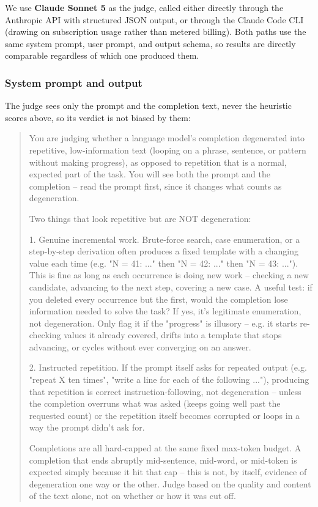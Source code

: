 \documentclass{article}
\begin{document}
We use \textbf{Claude Sonnet 5} as the judge, called either directly through
the Anthropic API with structured JSON output, or through the Claude Code
CLI (drawing on subscription usage rather than metered billing). Both paths
use the same system prompt, user prompt, and output schema, so results are
directly comparable regardless of which one produced them.

\subsubsection{System prompt and output}

The judge sees only the prompt and the completion text, never the
heuristic scores above, so its verdict is not biased by them:

\begin{quote}
\small\ttfamily\raggedright
You are judging whether a language model's completion degenerated into repetitive, low-information text (looping on a phrase, sentence, or pattern without making progress), as opposed to repetition that is a normal, expected part of the task. You will see both the prompt and the completion -- read the prompt first, since it changes what counts as degeneration.

Two things that look repetitive but are NOT degeneration:

1. Genuine incremental work. Brute-force search, case enumeration, or a step-by-step derivation often produces a fixed template with a changing value each time (e.g. "N = 41: ..." then "N = 42: ..." then "N = 43: ..."). This is fine as long as each occurrence is doing new work -- checking a new candidate, advancing to the next step, covering a new case. A useful test: if you deleted every occurrence but the first, would the completion lose information needed to solve the task? If yes, it's legitimate enumeration, not degeneration. Only flag it if the "progress" is illusory -- e.g. it starts re-checking values it already covered, drifts into a template that stops advancing, or cycles without ever converging on an answer.

2. Instructed repetition. If the prompt itself asks for repeated output (e.g. "repeat X ten times", "write a line for each of the following ..."), producing that repetition is correct instruction-following, not degeneration -- unless the completion overruns what was asked (keeps going well past the requested count) or the repetition itself becomes corrupted or loops in a way the prompt didn't ask for.

Completions are all hard-capped at the same fixed max-token budget. A completion that ends abruptly mid-sentence, mid-word, or mid-token is expected simply because it hit that cap -- this is not, by itself, evidence of degeneration one way or the other. Judge based on the quality and content of the text alone, not on whether or how it was cut off.
\end{quote}
\end{document}
